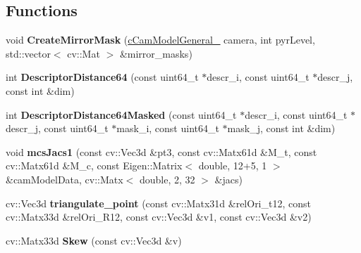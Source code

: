 \subsection*{Functions}
\begin{DoxyCompactItemize}
\item 
void {\bfseries Create\+Mirror\+Mask} (\hyperlink{classMultiColSLAM_1_1cCamModelGeneral__}{c\+Cam\+Model\+General\+\_\+} camera, int pyr\+Level, std\+::vector$<$ cv\+::\+Mat $>$ \&mirror\+\_\+masks)\hypertarget{namespaceMultiColSLAM_a811af28dc6066001e36647a4b94c6c08}{}\label{namespaceMultiColSLAM_a811af28dc6066001e36647a4b94c6c08}

\item 
int {\bfseries Descriptor\+Distance64} (const uint64\+\_\+t $\ast$descr\+\_\+i, const uint64\+\_\+t $\ast$descr\+\_\+j, const int \&dim)\hypertarget{namespaceMultiColSLAM_a68e3e5f5f53e4fcbd68ce823450804df}{}\label{namespaceMultiColSLAM_a68e3e5f5f53e4fcbd68ce823450804df}

\item 
int {\bfseries Descriptor\+Distance64\+Masked} (const uint64\+\_\+t $\ast$descr\+\_\+i, const uint64\+\_\+t $\ast$descr\+\_\+j, const uint64\+\_\+t $\ast$mask\+\_\+i, const uint64\+\_\+t $\ast$mask\+\_\+j, const int \&dim)\hypertarget{namespaceMultiColSLAM_af4eabdd88e301636e03b24e50ab52bb9}{}\label{namespaceMultiColSLAM_af4eabdd88e301636e03b24e50ab52bb9}

\item 
void {\bfseries mcs\+Jacs1} (const cv\+::\+Vec3d \&pt3, const cv\+::\+Matx61d \&M\+\_\+t, const cv\+::\+Matx61d \&M\+\_\+c, const Eigen\+::\+Matrix$<$ double, 12+5, 1 $>$ \&cam\+Model\+Data, cv\+::\+Matx$<$ double, 2, 32 $>$ \&jacs)\hypertarget{namespaceMultiColSLAM_aefbd83c7c4d3ecd52e2698ecdefdd79b}{}\label{namespaceMultiColSLAM_aefbd83c7c4d3ecd52e2698ecdefdd79b}

\item 
cv\+::\+Vec3d {\bfseries triangulate\+\_\+point} (const cv\+::\+Matx31d \&rel\+Ori\+\_\+t12, const cv\+::\+Matx33d \&rel\+Ori\+\_\+\+R12, const cv\+::\+Vec3d \&v1, const cv\+::\+Vec3d \&v2)\hypertarget{namespaceMultiColSLAM_a3d39f6ee0765b1b4bf17270e25e9898b}{}\label{namespaceMultiColSLAM_a3d39f6ee0765b1b4bf17270e25e9898b}

\item 
cv\+::\+Matx33d {\bfseries Skew} (const cv\+::\+Vec3d \&v)\hypertarget{namespaceMultiColSLAM_abf048ed021104f1638b290f3d1c9e0f1}{}\label{namespaceMultiColSLAM_abf048ed021104f1638b290f3d1c9e0f1}


\end{DoxyCompactItemize}
